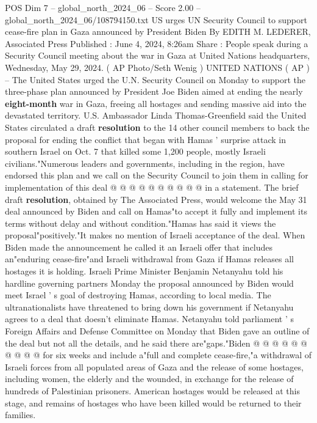 \begin{textsample}{POS Dim 7 – global\_north\_2024\_06 – Score 2.00 – global\_north\_2024\_06/108794150.txt}  \label{ex:f7_pos_312}
US urges UN Security Council to support cease-fire plan in Gaza announced by President Biden By EDITH M.
LEDERER, Associated Press Published : June 4, 2024, 8:26am Share : People speak during a Security Council meeting about the war in Gaza at United Nations headquarters, Wednesday, May 29, 2024. ( AP Photo/Seth Wenig ) UNITED NATIONS ( AP ) -- The United States urged the U.N.
Security Council on Monday to support the three-phase plan announced by President Joe Biden aimed at ending the nearly \textbf{eight-month} war in Gaza, freeing all hostages and sending massive aid into the devastated territory.
U.S.
Ambassador Linda Thomas-Greenfield said the United States circulated a draft \textbf{resolution} to the 14 other council members to back the proposal for ending the conflict that began with Hamas ' surprise attack in southern Israel on Oct. 7 that killed some 1,200 people, mostly Israeli civilians."Numerous leaders and governments, including in the region, have endorsed this plan and we call on the Security Council to join them in calling for implementation of this deal @ @ @ @ @ @ @ @ @ @ in a statement.
The brief draft \textbf{resolution}, obtained by The Associated Press, would welcome the May 31 deal announced by Biden and call on Hamas"to accept it fully and implement its terms without delay and without condition."Hamas has said it views the proposal"positively."It makes no mention of Israeli acceptance of the deal.
When Biden made the announcement he called it an Israeli offer that includes an"enduring cease-fire"and Israeli withdrawal from Gaza if Hamas releases all hostages it is holding.
Israeli Prime Minister Benjamin Netanyahu told his hardline governing partners Monday the proposal announced by Biden would meet Israel ' s goal of destroying Hamas, according to local media.
The ultranationalists have threatened to bring down his government if Netanyahu agrees to a deal that doesn't eliminate Hamas.
Netanyahu told parliament ' s Foreign Affairs and Defense Committee on Monday that Biden gave an outline of the deal but not all the details, and he said there are"gaps."Biden @ @ @ @ @ @ @ @ @ @ for six weeks and include a"full and complete cease-fire,"a withdrawal of Israeli forces from all populated areas of Gaza and the release of some hostages, including women, the elderly and the wounded, in exchange for the release of hundreds of Palestinian prisoners.
American hostages would be released at this stage, and remains of hostages who have been killed would be returned to their families.

\end{textsample}
